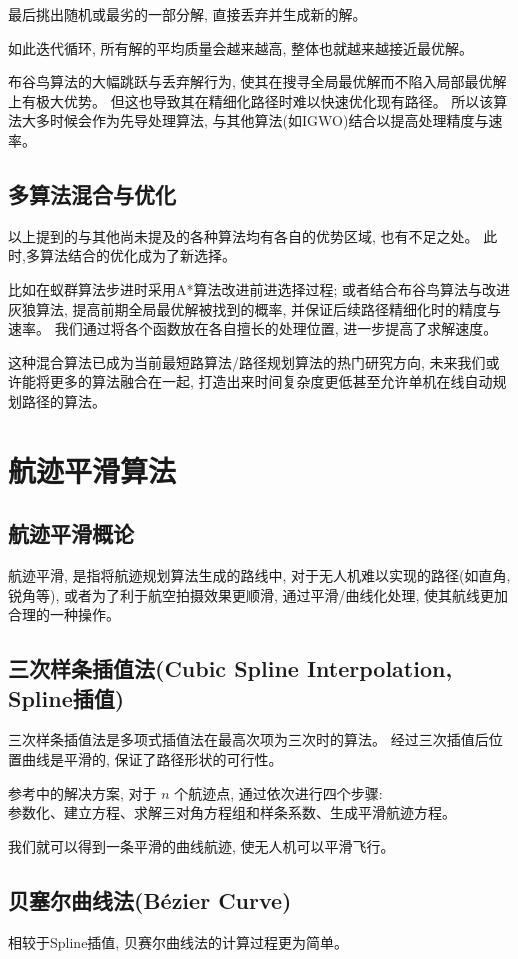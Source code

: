 \documentclass[12pt,a4paper,oneside,UTF8]{ctexart}
\begin{document}
最后挑出随机或最劣的一部分解,
直接丢弃并生成新的解。

如此迭代循环,
所有解的平均质量会越来越高,
整体也就越来越接近最优解。

布谷鸟算法的大幅跳跃与丢弃解行为,
使其在搜寻全局最优解而不陷入局部最优解上有极大优势。
但这也导致其在精细化路径时难以快速优化现有路径。
所以该算法大多时候会作为先导处理算法,
与其他算法(如IGWO)结合以提高处理精度与速率。
\subsection{多算法混合与优化}
以上提到的与其他尚未提及的各种算法均有各自的优势区域,
也有不足之处。
此时,多算法结合的优化成为了新选择。

比如在蚁群算法步进时采用A*算法改进前进选择过程;
或者结合布谷鸟算法与改进灰狼算法,
提高前期全局最优解被找到的概率,
并保证后续路径精细化时的精度与速率。
我们通过将各个函数放在各自擅长的处理位置,
进一步提高了求解速度。

这种混合算法已成为当前最短路算法/路径规划算法的热门研究方向,
未来我们或许能将更多的算法融合在一起,
打造出来时间复杂度更低甚至允许单机在线自动规划路径的算法。
\newpage\section{航迹平滑算法}
\subsection{航迹平滑概论}
航迹平滑,
是指将航迹规划算法生成的路线中,
对于无人机难以实现的路径(如直角,锐角等),
或者为了利于航空拍摄效果更顺滑,
通过平滑/曲线化处理,
使其航线更加合理的一种操作。
\subsection{三次样条插值法(Cubic Spline Interpolation, Spline插值)}
三次样条插值法是多项式插值法在最高次项为三次时的算法。
经过三次插值后位置曲线是平滑的,
保证了路径形状的可行性。

参考\cite{ref11}中的解决方案,
对于 $n$ 个航迹点,
通过依次进行四个步骤:\\
参数化、建立方程、求解三对角方程组和样条系数、生成平滑航迹方程。

我们就可以得到一条平滑的曲线航迹,
使无人机可以平滑飞行。

\subsection{贝塞尔曲线法(Bézier Curve)}
相较于Spline插值,
贝赛尔曲线法的计算过程更为简单。
\end{document}
